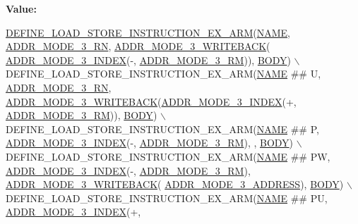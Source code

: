 {\bfseries Value\+:}
\begin{DoxyCode}
\mbox{\hyperlink{isa-arm_8c_af3fcd6969f12879634732491de99e437}{DEFINE\_LOAD\_STORE\_INSTRUCTION\_EX\_ARM}}(\mbox{\hyperlink{inflate_8h_a164ea0159d5f0b5f12a646f25f99eceaa67bc2ced260a8e43805d2480a785d312}{NAME}}, 
      \mbox{\hyperlink{isa-arm_8c_af5d2ca0f35ebb0be20fb9caf92ec6403}{ADDR\_MODE\_3\_RN}}, \mbox{\hyperlink{isa-arm_8c_a0d44b0f2a0d138f9a20b8c02b2b48729}{ADDR\_MODE\_3\_WRITEBACK}}(
      \mbox{\hyperlink{isa-arm_8c_a7ce011f92bca494c8cd99803901c5b50}{ADDR\_MODE\_3\_INDEX}}(-, \mbox{\hyperlink{isa-arm_8c_a9db2761742bcba3e3d9cfbfd49037ed2}{ADDR\_MODE\_3\_RM}})), \mbox{\hyperlink{gzlog_8c_aa6bdf6a6d9916c343e1e17774d84a156}{BODY}}) \(\backslash\)
    DEFINE\_LOAD\_STORE\_INSTRUCTION\_EX\_ARM(\mbox{\hyperlink{inflate_8h_a164ea0159d5f0b5f12a646f25f99eceaa67bc2ced260a8e43805d2480a785d312}{NAME}} ## U, \mbox{\hyperlink{isa-arm_8c_af5d2ca0f35ebb0be20fb9caf92ec6403}{ADDR\_MODE\_3\_RN}}, 
      \mbox{\hyperlink{isa-arm_8c_a0d44b0f2a0d138f9a20b8c02b2b48729}{ADDR\_MODE\_3\_WRITEBACK}}(\mbox{\hyperlink{isa-arm_8c_a7ce011f92bca494c8cd99803901c5b50}{ADDR\_MODE\_3\_INDEX}}(+, 
      \mbox{\hyperlink{isa-arm_8c_a9db2761742bcba3e3d9cfbfd49037ed2}{ADDR\_MODE\_3\_RM}})), \mbox{\hyperlink{gzlog_8c_aa6bdf6a6d9916c343e1e17774d84a156}{BODY}}) \(\backslash\)
    DEFINE\_LOAD\_STORE\_INSTRUCTION\_EX\_ARM(\mbox{\hyperlink{inflate_8h_a164ea0159d5f0b5f12a646f25f99eceaa67bc2ced260a8e43805d2480a785d312}{NAME}} ## P, \mbox{\hyperlink{isa-arm_8c_a7ce011f92bca494c8cd99803901c5b50}{ADDR\_MODE\_3\_INDEX}}(-, 
      \mbox{\hyperlink{isa-arm_8c_a9db2761742bcba3e3d9cfbfd49037ed2}{ADDR\_MODE\_3\_RM}}), , \mbox{\hyperlink{gzlog_8c_aa6bdf6a6d9916c343e1e17774d84a156}{BODY}}) \(\backslash\)
    DEFINE\_LOAD\_STORE\_INSTRUCTION\_EX\_ARM(\mbox{\hyperlink{inflate_8h_a164ea0159d5f0b5f12a646f25f99eceaa67bc2ced260a8e43805d2480a785d312}{NAME}} ## PW, \mbox{\hyperlink{isa-arm_8c_a7ce011f92bca494c8cd99803901c5b50}{ADDR\_MODE\_3\_INDEX}}(-, 
      \mbox{\hyperlink{isa-arm_8c_a9db2761742bcba3e3d9cfbfd49037ed2}{ADDR\_MODE\_3\_RM}}), \mbox{\hyperlink{isa-arm_8c_a0d44b0f2a0d138f9a20b8c02b2b48729}{ADDR\_MODE\_3\_WRITEBACK}}(
      \mbox{\hyperlink{isa-arm_8c_ae2a849434504cbd28290fd7743dead97}{ADDR\_MODE\_3\_ADDRESS}}), \mbox{\hyperlink{gzlog_8c_aa6bdf6a6d9916c343e1e17774d84a156}{BODY}}) \(\backslash\)
    DEFINE\_LOAD\_STORE\_INSTRUCTION\_EX\_ARM(\mbox{\hyperlink{inflate_8h_a164ea0159d5f0b5f12a646f25f99eceaa67bc2ced260a8e43805d2480a785d312}{NAME}} ## PU, \mbox{\hyperlink{isa-arm_8c_a7ce011f92bca494c8cd99803901c5b50}{ADDR\_MODE\_3\_INDEX}}(+, 

\end{DoxyCode}
